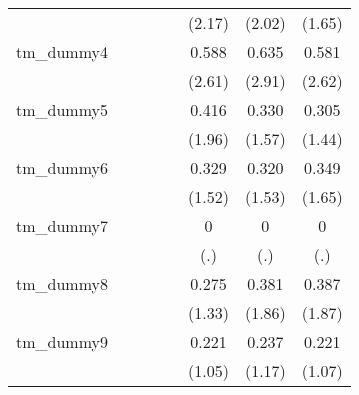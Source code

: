{\begin{tabular}{l*{7}{c}}
            &                     &                     &                     &                     &      (2.17)         &      (2.02)         &      (1.65)         \\
[1em]
tm\_dummy4   &                     &                     &                     &                     &       0.588\sym{**} &       0.635\sym{**} &       0.581\sym{**} \\
            &                     &                     &                     &                     &      (2.61)         &      (2.91)         &      (2.62)         \\
[1em]
tm\_dummy5   &                     &                     &                     &                     &       0.416         &       0.330         &       0.305         \\
            &                     &                     &                     &                     &      (1.96)         &      (1.57)         &      (1.44)         \\
[1em]
tm\_dummy6   &                     &                     &                     &                     &       0.329         &       0.320         &       0.349         \\
            &                     &                     &                     &                     &      (1.52)         &      (1.53)         &      (1.65)         \\
[1em]
tm\_dummy7   &                     &                     &                     &                     &           0         &           0         &           0         \\
            &                     &                     &                     &                     &         (.)         &         (.)         &         (.)         \\
[1em]
tm\_dummy8   &                     &                     &                     &                     &       0.275         &       0.381         &       0.387         \\
            &                     &                     &                     &                     &      (1.33)         &      (1.86)         &      (1.87)         \\
[1em]
tm\_dummy9   &                     &                     &                     &                     &       0.221         &       0.237         &       0.221         \\
            &                     &                     &                     &                     &      (1.05)         &      (1.17)         &      (1.07)         \\

\end{tabular}}
